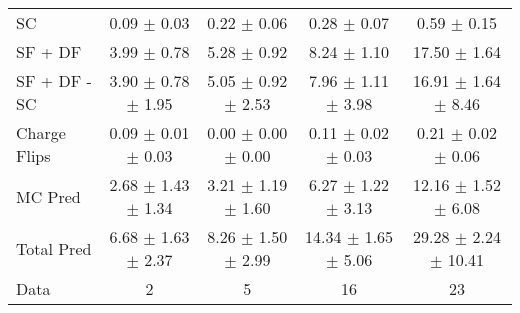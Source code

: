 \begin{tabular}{l|cccc}
                                 SC &  0.09 $\pm$  0.03 &  0.22 $\pm$  0.06 &  0.28 $\pm$  0.07 &  0.59 $\pm$  0.15 \\
                            SF + DF &  3.99 $\pm$  0.78 &  5.28 $\pm$  0.92 &  8.24 $\pm$  1.10 & 17.50 $\pm$  1.64 \\
\hline
                       SF + DF - SC &  3.90 $\pm$  0.78 $\pm$  1.95 &  5.05 $\pm$  0.92 $\pm$  2.53 &  7.96 $\pm$  1.11 $\pm$  3.98 & 16.91 $\pm$  1.64 $\pm$  8.46 \\
\hline\hline
                       Charge Flips &  0.09 $\pm$  0.01 $\pm$  0.03 &  0.00 $\pm$  0.00 $\pm$  0.00 &  0.11 $\pm$  0.02 $\pm$  0.03 &  0.21 $\pm$  0.02 $\pm$  0.06 \\
\hline
                            MC Pred &  2.68 $\pm$  1.43 $\pm$  1.34 &  3.21 $\pm$  1.19 $\pm$  1.60 &  6.27 $\pm$  1.22 $\pm$  3.13 & 12.16 $\pm$  1.52 $\pm$  6.08 \\
\hline
                         Total Pred &  6.68 $\pm$  1.63 $\pm$  2.37 &  8.26 $\pm$  1.50 $\pm$  2.99 & 14.34 $\pm$  1.65 $\pm$  5.06 & 29.28 $\pm$  2.24 $\pm$ 10.41 \\
\hline\hline
                               Data &     2 &     5 &    16 &    23 \\
\hline\hline
\end{tabular}

